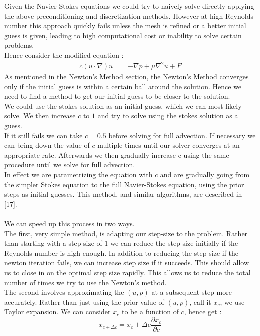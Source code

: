 \documentclass[11pt,twoside,a4paper]{article}
\begin{document}
Given the Navier-Stokes equations we could try to naively solve directly applying the above preconditioning and discretization methods. However at high Reynolds number this approach quickly fails unless the mesh is refined or a better initial guess is given, leading to high computational cost or inability to solve certain problems.\\
Hence consider the modified equation :
\begin{align}
c (u \cdot \nabla) u &= -\nabla p + \mu \nabla^2 u + F
\end{align}
As mentioned in the Newton's Method section, the Newton's Method converges only if the initial guess is within a certain ball around the solution. Hence we need to find a method to get our initial guess to be closer to the solution.\\
We could use the stokes solution as an initial guess, which we can most likely solve. We then increase $c$ to $1$ and try to solve using the stokes solution as a guess. \\
If it still fails we can take $c =0.5$ before solving for full advection. If necessary we can bring down the value of $c$ multiple times until our solver converges at an appropriate rate. Afterwards we then gradually increase c using the same procedure until we solve for full advection.\\
In effect we are parametrizing the equation with $c$ and are gradually going from the simpler Stokes equation to the full Navier-Stokes equation, using the prior steps as initial guesses. This method, and similar algorithms, are described in [17].\\
\\
We can speed up this process in two ways.\\
The first, very simple method, is adapting our step-size to the problem. Rather than starting with a step size of $1$ we can reduce the step size initially if the Reynolds number is high enough. In addition to reducing the step size if the newton iteration fails, we can increase step size if it succeeds. This should allow us to close in on the optimal step size rapidly. This allows us to reduce the total number of times we try to use the Newton's method.\\
The second involves approximating the $(u,p)$ at a subsequent step more accurately. Rather than just using the prior value of $(u,p)$, call it $x_c$, we use Taylor expansion. We can consider $x_c$ to be a function of $c$, hence get :
$$
x_{c+\Delta c} = x_c + \Delta c \frac{\partial x_c}{\partial c}
$$
\end{document}
